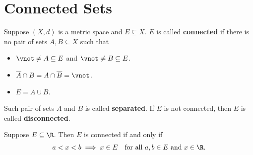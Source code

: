 \section{Connected Sets}

\begin{definition} \label{an:def:connected-set}
  Suppose $(X, d)$ is a metric space and $E \subseteq X$. $E$ is called \textbf{connected}
  if there is no pair of sets $A, B \subseteq X$ such that
  \begin{itemize}
    \item $\vnot \neq A \subseteq E$ and $\vnot \neq B \subseteq E$.
    \item $\overline{A} \cap B = A \cap \overline{B} = \vnot$.
    \item $E = A \cup B$.
  \end{itemize}
  Such pair of sets $A$ and $B$ is called \textbf{separated}.
  If $E$ is not connected, then $E$ is called \textbf{disconnected}.

\end{definition}

\bigskip

\begin{theorem} \label{an:thm:connected-sets-in-R}
  Suppose $E \subseteq \R$. Then $E$ is connected if and only if
  \[
    a < x < b \implies x \in E \quad \text{for all } a, b \in E \text{ and } x \in \R.
  \]
\end{theorem}

